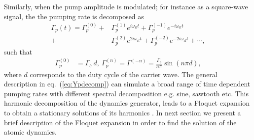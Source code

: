 \documentclass[%
reprint,
 amsmath,amssymb,
 aps,
floatfix,
]{revtex4-1}
\begin{document}
Similarly, when the pump amplitude is modulated; for instance as a square-wave signal, the the pumping rate is decomposed as 
\begin{align}
\Gamma_p(t)=\Gamma_p^{(0)}+& \Gamma_p^{(1)} e^{i\omega_{\mathrm{rf}} t} +\Gamma_p^{(-1)}e^{-i\omega_{\mathrm{rf}} t} \nonumber\\
+& \Gamma_p^{(2)} e^{2i\omega_{\mathrm{rf}} t} +\Gamma_p^{(-2)}e^{-2i\omega_{\mathrm{rf}} t}+\cdots,\label{eq:Ypdecomp}
\end{align}
such that
\begin{align}
\Gamma_p^{(0)}&=\Gamma_b\ d,\ 
\Gamma_p^{(n)}=\Gamma^{(-n)}=\frac{\Gamma_b}{n\pi}\sin(n\pi d),
\end{align}
where $d$ corresponds to the duty cycle of the carrier wave.
The general description in eq.~(\ref{eq:Ypdecomp}) can simulate a broad range of time dependent pumping rates with different spectral decomposition e.g. sine, sawtooth etc. This harmonic decomposition of the dynamics generator, leads to a Floquet expansion to obtain a stationary solutions of its harmonics \cite{Floquet21}. In next section we present a brief description of the Floquet expansion in order to find the solution of the atomic dynamics.
\end{document}
